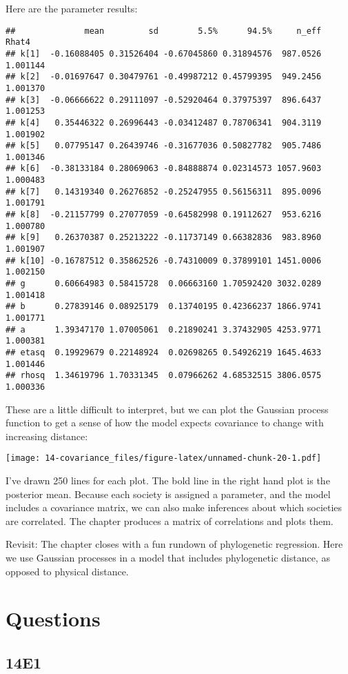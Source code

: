 \documentclass[
]{book}
\begin{document}
Here are the parameter results:

\begin{verbatim}
##              mean         sd        5.5%      94.5%     n_eff    Rhat4
## k[1]  -0.16088405 0.31526404 -0.67045860 0.31894576  987.0526 1.001144
## k[2]  -0.01697647 0.30479761 -0.49987212 0.45799395  949.2456 1.001370
## k[3]  -0.06666622 0.29111097 -0.52920464 0.37975397  896.6437 1.001253
## k[4]   0.35446322 0.26996443 -0.03412487 0.78706341  904.3119 1.001902
## k[5]   0.07795147 0.26439746 -0.31677036 0.50827782  905.7486 1.001346
## k[6]  -0.38133184 0.28069063 -0.84888874 0.02314573 1057.9603 1.000483
## k[7]   0.14319340 0.26276852 -0.25247955 0.56156311  895.0096 1.001791
## k[8]  -0.21157799 0.27077059 -0.64582998 0.19112627  953.6216 1.000780
## k[9]   0.26370387 0.25213222 -0.11737149 0.66382836  983.8960 1.001907
## k[10] -0.16787512 0.35862526 -0.74310009 0.37899101 1451.0006 1.002150
## g      0.60664983 0.58415728  0.06663160 1.70592420 3032.0289 1.001418
## b      0.27839146 0.08925179  0.13740195 0.42366237 1866.9741 1.001771
## a      1.39347170 1.07005061  0.21890241 3.37432905 4253.9771 1.000381
## etasq  0.19929679 0.22148924  0.02698265 0.54926219 1645.4633 1.001446
## rhosq  1.34619796 1.70331345  0.07966262 4.68532515 3806.0575 1.000336
\end{verbatim}

These are a little difficult to interpret, but we can plot the Gaussian process function to get a sense of how the model expects covariance to change with increasing distance:

\texttt{[image: 14-covariance\_files/figure-latex/unnamed-chunk-20-1.pdf]}

I've drawn 250 lines for each plot. The bold line in the right hand plot is the posterior mean. Because each society is assigned a parameter, and the model includes a covariance matrix, we can also make inferences about which societies are correlated. The chapter produces a matrix of correlations and plots them.

Revisit: The chapter closes with a fun rundown of phylogenetic regression. Here we use Gaussian processes in a model that includes phylogenetic distance, as opposed to physical distance.

\hypertarget{questions-13}{%
\section{Questions}\label{questions-13}}

\hypertarget{e1-11}{%
\subsection*{14E1}\label{e1-11}}
\end{document}
